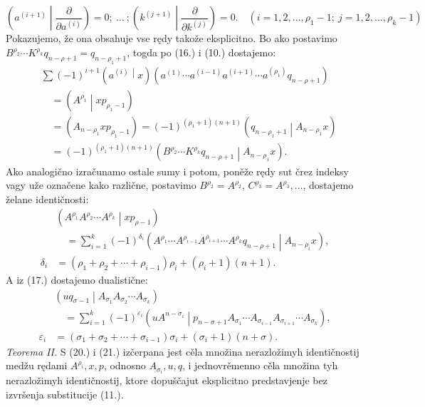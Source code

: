 \documentclass[11pt]{article}
\newcommand{\pair}[2]{\left(#1\middle|#2\right)}
\newcommand{\eps}{\varepsilon}
\begin{document}
\begin{equation}
 \left(a^{(i+1)}\middle|\frac{\partial}{\partial a^{(i)}}\right)=0;\ \ldots\ ;
 \left(k^{(j+1)}\middle|\frac{\partial}{\partial k^{(j)}}\right)=0.
 \quad (i=1,2,\ldots,\rho_1-1;\ j=1,2,\ldots,\rho_k-1)
\tag{19}
\end{equation}
Pokazujemo, že ona obsahuje vse rędy takože eksplicitno. Bo ako postavimo $B^{\rho_2}\cdots K^{\rho_k}q_{n-\rho+1}=q_{n-\rho_1+1}$, togda po (16.) i (10.) dostajemo:
\[
\begin{aligned}
&\sum(-1)^{i+1}\pair{a^{(i)}}{x}
(a^{(1)}\cdots a^{(i-1)}a^{(i+1)}\cdots a^{(\rho_1)}q_{n-\rho+1})\\
&\quad=\pair{A^{\rho_1}}{xp_{\rho_1-1}}\\
&\quad=(A_{n-\rho_1}xp_{\rho_1-1})
=(-1)^{(\rho_1+1)(n+1)}\pair{q_{n-\rho_1+1}}{A_{n-\rho_1}x}\\
&\quad=(-1)^{(\rho_1+1)(n+1)}
\pair{B^{\rho_2}\cdots K^{\rho_k}q_{n-\rho+1}}{A_{n-\rho_1}x}.
\end{aligned}
\]
Ako analogično izračunamo ostale sumy i potom, poněže rędy sut črez indeksy vagy uže označene kako različne, postavimo $B^{\rho_2}=A^{\rho_2}$, $C^{\rho_3}=A^{\rho_3},\ldots$, dostajemo želane identičnosti:
\begin{equation}
\begin{aligned}
&\pair{A^{\rho_1}A^{\rho_2}\cdots A^{\rho_k}}{xp_{\rho-1}}\\
&\quad=\sum_{i=1}^{k}(-1)^{\delta_i}
\pair{A^{\rho_1}\cdots A^{\rho_{i-1}}A^{\rho_{i+1}}\cdots A^{\rho_k}q_{n-\rho+1}}{A_{n-\rho_i}x},\\
\delta_i&=(\rho_1+\rho_2+\cdots+\rho_{i-1})\rho_i+(\rho_i+1)(n+1).
\end{aligned}
\tag{20}
\end{equation}
A iz (17.) dostajemo dualistične:
\begin{equation}
\begin{aligned}
&\pair{u q_{\sigma-1}}{A_{\sigma_1}A_{\sigma_2}\cdots A_{\sigma_k}}\\
&\quad=\sum_{i=1}^{k}(-1)^{\eps_i}
\pair{u A^{n-\sigma_i}}{p_{n-\sigma+1}A_{\sigma_1}\cdots A_{\sigma_{i-1}}A_{\sigma_{i+1}}\cdots A_{\sigma_k}},\\
\eps_i&=(\sigma_1+\sigma_2+\cdots+\sigma_{i-1})\sigma_i+(\sigma_i+1)(n+\sigma).
\end{aligned}
\tag{21}
\end{equation}
\emph{Teorema II.} S (20.) i (21.) izčerpana jest cěla množina nerazložimyh identičnostij medžu rędami $A^{\rho_i},x,p$, odnosno $A_{\sigma_i},u,q$, i jednovrěmenno cěla množina tyh nerazložimyh identičnostij, ktore dopuščajut eksplicitno predstavjenje bez izvršenja substitucije (11.).
\end{document}
